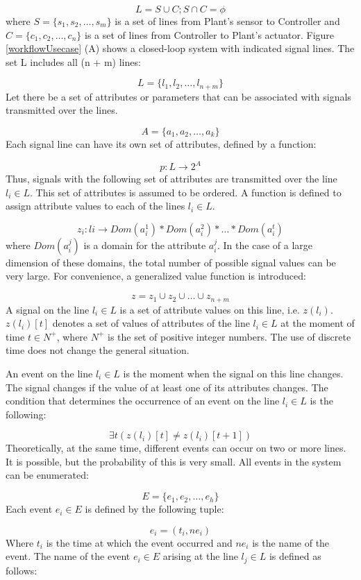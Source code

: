 \documentclass{ieeeojies}
\begin{document}
\[ L = S\cup C; S\cap C = \phi \]
where $ S=\{s_1,s_2,\dots,s_m\} $ is a set of lines from Plant’s sensor to Controller and $ C=\{c_1,c_2,\dots,c_n\} $ is a set of lines from Controller to Plant’s actuator. 
Figure \ref{workflowUsecase}  (A)  shows a closed-loop system with indicated signal lines. The set L includes all (n + m) lines: 

\[L=\{l_1,l_2,\dots,l_{n+m}\}\]
Let there be a set of attributes or parameters that can be associated with signals transmitted over the lines.

\[ A=\{a_1,a_2,\dots,a_k\} \]
Each signal line can have its own set of attributes, defined by a function:

\[p:L\rightarrow 2^A\]
Thus, signals with the following set of attributes are transmitted over the line $ l_i \in L$. This set of attributes is assumed to be ordered. A function is defined to assign attribute values to each of the lines  $ l_i \in L$.

\[ z_i: li\rightarrow Dom(a_i^1) * Dom(a_i^2) * \dots * Dom(a_i^t) \]
where $ Dom(a_i^j) $ is a domain for the attribute  $ a_i^j $. 
In the case of a large dimension of these domains, the total number of possible signal values can be very large. For convenience, a generalized value function is introduced: 

\[ z=z_1 \cup z_2 \cup \dots \cup z_{n+m}  \]
A signal on the line $ l_i \in L$ is a set of attribute values on this line, i.e. $z(l_i)$.
$z(l_i)[t]$ denotes a set of values of attributes of the line $ l_i \in L$ at the moment of time $ t \in  N^+ $, where $N^+ $ is the set of positive integer numbers. The use of  discrete time does not change the general situation. 

An event on the line $ l_i \in L$ is the moment when the signal on this line changes. The signal changes if the value of at least one of its attributes changes. The condition that determines the occurrence of an event on the line  $ l_i \in L$ is the following: 


\[ \exists t (z(l_i)[t] \ne z(l_i)[t+1]) \]
Theoretically, at the same time, different events can occur on two or more lines. It is possible, but the probability of this is very small. All events in the system can be enumerated: 


\[ E=\{e_1,e_2,\dots, e_h\} \]
Each event $ e_i \in E  $ is defined by the following tuple:

\[ e_i = (t_i, ne_i) \]
Where $t_i$ is the time at which the event occurred and $ne_i$ is the name of the event. The name of the event $e_i \in E $ arising   at the line $l_j \in L$ is defined as follows:
\end{document}
